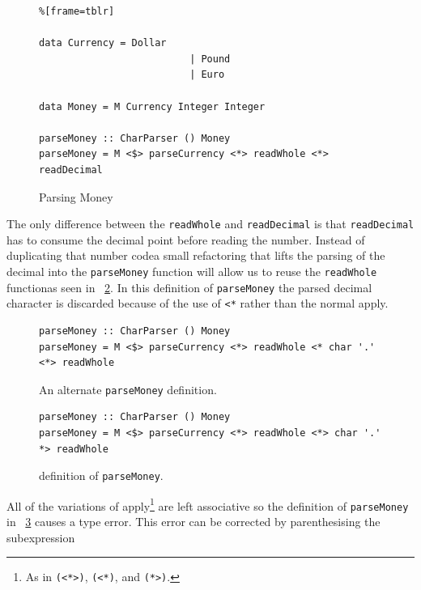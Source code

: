 \begin{figure}[t]
 \begin{lstlisting}%[frame=tblr]

data Currency = Dollar
                          | Pound
                          | Euro

data Money = M Currency Integer Integer

parseMoney :: CharParser () Money
parseMoney = M <$> parseCurrency <*> readWhole <*> readDecimal
 \end{lstlisting}
 \caption{Parsing Money}
 \label{parseMoney}
 \end{figure}

The only difference between the \texttt{readWhole} and \texttt{readDecimal} is that \texttt{readDecimal} has to consume the decimal point before reading the number. Instead of duplicating that number code\DIFaddbegin \DIFadd{, }\DIFaddend a small refactoring that lifts the parsing of the decimal into the \texttt{parseMoney} function \DIFdelbegin {}\DIFdelend will allow us to reuse the \texttt{readWhole} function\DIFaddbegin \DIFadd{, }\DIFaddend as seen in \DIFdelbegin {}\DIFdelend \DIFaddbegin {}\DIFaddend ~\ref{altParseMoney}. In this definition of \texttt{parseMoney} the parsed decimal character is discarded because of the use of \texttt{<*} rather than the normal apply.

\begin{figure}[t]
 \begin{lstlisting}
parseMoney :: CharParser () Money
parseMoney = M <$> parseCurrency <*> readWhole <* char '.' <*> readWhole
 \end{lstlisting}
 \caption{An alternate \texttt{parseMoney} definition.}
 \label{altParseMoney}
\end{figure}

 
 \begin{figure}[t] 
  \begin{lstlisting}
parseMoney :: CharParser () Money
parseMoney = M <$> parseCurrency <*> readWhole <*> char '.' *> readWhole
 \end{lstlisting}
 \caption{\DIFdelbeginFL {}\DIFdelendFL \DIFaddbeginFL {}\DIFaddendFL definition of \texttt{parseMoney}\DIFdelbeginFL {}\DIFdelendFL .}
 \label{typeParseErr}
 \end{figure}

All of the variations of apply\footnote{As in \texttt{(<*>)}, \texttt{(<*)}, and \texttt{(*>)}.} are left associative so \DIFaddbegin {}\DIFaddend the definition of \texttt{parseMoney} in \DIFdelbegin {}\DIFdelend \DIFaddbegin {}\DIFaddend ~\ref{typeParseErr} causes a type error. This error can be corrected by parenthesising the subexpression\DIFdelbegin %
\DIFdelend \DIFaddbegin \DIFadd{:
}

